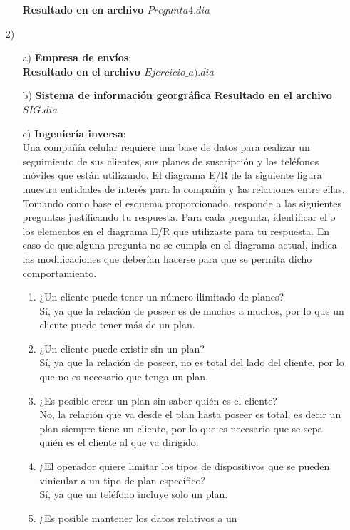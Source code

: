 \documentclass[a4paper, 12pt]{report}
\begin{document}
\begin{enumerate}
\begin{enumerate}
{    \textbf{Resultado en en archivo 
    $Pregunta4.dia$}
 }
\end{enumerate}
	\item[2)]{}
\begin{enumerate}
    \item[a)]\textbf{Empresa de envíos}:\\
    \textbf{Resultado en el archivo $Ejercicio \_ a).dia$}
    \item[b)]\textbf{Sistema de información georgráfica }
    \textbf{Resultado en el archivo $SIG.dia$}
    \item[c)]\textbf{Ingeniería inversa}:\\
		Una compañía celular requiere una base de datos para realizar
		un seguimiento de sus clientes, sus planes de suscripción y 
		los teléfonos móviles que  están  utilizando.  El diagrama 
		E/R de  la  siguiente figura  muestra  entidades  de  interés  
		para  la  compañía  y  las  relaciones  entre  ellas.  
		Tomando  como base el esquema proporcionado, responde a las 
		siguientes preguntas justificando tu respuesta. Para cada 
		pregunta, identificar el o los elementos en el diagrama E/R 
		que utilizaste para tu respuesta. En caso de que alguna 
		pregunta no se cumpla en el diagrama actual, indica las 
		modificaciones que deberían hacerse para que se permita dicho 
		comportamiento.\\
		\begin{enumerate}
			\item ¿Un cliente puede tener un número ilimitado de planes?\\
			Sí, ya que la relación de poseer es de muchos a muchos, por
			lo que un cliente puede tener más de un plan.
			\item ¿Un cliente puede existir sin un plan?\\
			Sí, ya que la relación de poseer, no es total del lado del 
			cliente, por lo que no es necesario que tenga un plan.
			\item ¿Es posible crear un plan sin saber quién es el 
			cliente?\\
			No, la relación que va desde el plan hasta poseer es total,
			es decir un plan siempre tiene un cliente, por lo que es
			necesario que se sepa quién es el cliente al que va 
			dirigido.
			\item ¿El operador quiere limitar los tipos de dispositivos
			que se pueden vinicular a un tipo de plan específico?\\
			Sí, ya que un teléfono incluye solo un plan.
			\item ¿Es posible mantener los datos relativos a un 

\end{enumerate}
\end{enumerate}
\end{enumerate}
\end{document}
